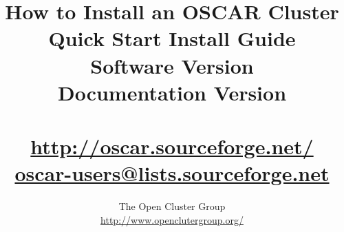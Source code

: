 %
%
%

\title{How to Install an OSCAR Cluster \\
Quick Start Install Guide \\
Software Version \oscarversion \\
Documentation Version \docsversion \\
\ \\
\url{http://oscar.sourceforge.net/} \\
\href{mailto:oscar-users@lists.sourceforge.net}{oscar-users@lists.sourceforge.net}}

\author{The Open Cluster Group \\
\url{http://www.openclutergroup.org/}}
\maketitle
